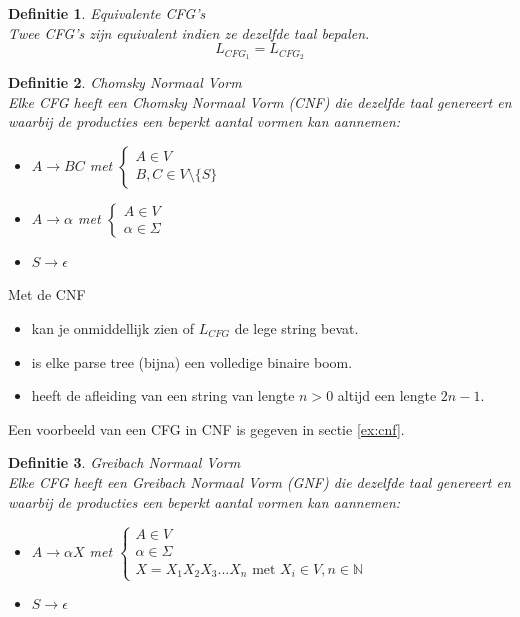 \documentclass[a4paper]{article}
\newtheorem{tdefinitie}{Definitie}[section]
\newenvironment{definitie}[1]%
  {\begin{mdframed}[backgroundcolor=silver,
    topline=false,
    rightline=false,
    leftline=false,
    bottomline=false]\begin{tdefinitie}#1\\\normalfont}%
  {\end{tdefinitie}\end{mdframed}}
\newcommand{\nat}{\ensuremath{\mathbb{N}}}
\begin{document}
\begin{definitie}{Equivalente CFG's}
  Twee CFG's zijn equivalent indien ze dezelfde taal bepalen.
  \begin{equation*}
  L_{CFG_1} = L_{CFG_2}
  \end{equation*}
\end{definitie}

\begin{definitie}{Chomsky Normaal Vorm}
  \label{def:cnf}
  Elke CFG heeft een Chomsky Normaal Vorm (CNF) die dezelfde taal genereert en waarbij de producties een beperkt aantal vormen kan aannemen:
  \begin{itemize}
  \item $A \rightarrow BC$ met $\begin{cases}A \in V \\ B,C \in V \setminus \{S\}\end{cases}$
  \item $A \rightarrow \alpha$ met $\begin{cases}A \in V \\ \alpha \in \Sigma\end{cases}$
  \item $S \rightarrow \epsilon$
  \end{itemize}
\end{definitie}

Met de CNF
\begin{itemize}
\item kan je onmiddellijk zien of $L_{CFG}$ de lege string bevat.
\item is elke parse tree (bijna) een volledige binaire boom.
\item heeft de afleiding van een string van lengte $n > 0$ altijd een lengte $2n-1$.
\end{itemize}

Een voorbeeld van een CFG in CNF is gegeven in sectie \ref{ex:cnf}.


\begin{definitie}{Greibach Normaal Vorm}
  Elke CFG heeft een Greibach Normaal Vorm (GNF) die dezelfde taal genereert en waarbij de producties een beperkt aantal vormen kan aannemen:
  \begin{itemize}
  \item $A \rightarrow \alpha X$ met $\begin{cases}A \in V \\ \alpha \in \Sigma \\ X = X_1X_2X_3...X_n \text{ met } X_i \in V, n \in \nat\end{cases}$
  \item $S \rightarrow \epsilon$
  \end{itemize}
\end{definitie}
\end{document}
